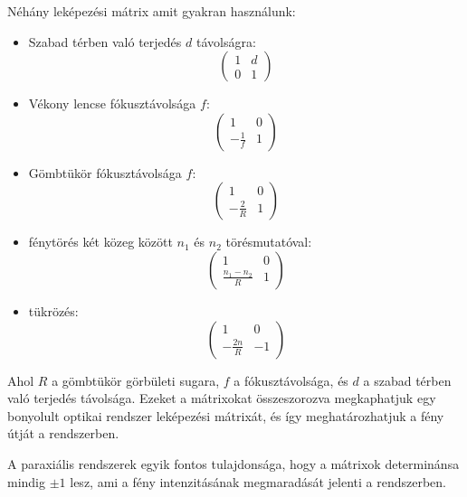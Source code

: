 \documentclass[a4paper,12pt]{article}
\begin{document}
Néhány leképezési mátrix amit gyakran használunk:
\begin{itemize}
    \item Szabad térben való terjedés $d$ távolságra:
    \begin{equation}
        \begin{pmatrix}
            1 & d \\
            0 & 1
        \end{pmatrix}
    \end{equation}
    \item Vékony lencse fókusztávolsága $f$:
    \begin{equation}
        \begin{pmatrix}
            1 & 0 \\
            -\frac{1}{f} & 1
        \end{pmatrix}
    \end{equation}
    \item Gömbtükör fókusztávolsága $f$:
    \begin{equation}
        \begin{pmatrix}
            1 & 0 \\
            -\frac{2}{R} & 1
        \end{pmatrix}
    \end{equation}
    \item fénytörés két közeg között $n_1$ és $n_2$ törésmutatóval:
    \begin{equation}
        \begin{pmatrix}
            1 & 0 \\
            \frac{n_1 - n_2}{R} & 1
        \end{pmatrix}
    \end{equation}
    \item tükrözés:
    \begin{equation}
        \begin{pmatrix}
            1 & 0 \\
            -\frac{2n}{R} & -1
        \end{pmatrix}
    \end{equation}
\end{itemize}
Ahol $R$ a gömbtükör görbületi sugara, $f$ a fókusztávolsága, és $d$ a szabad térben való terjedés távolsága. Ezeket a mátrixokat összeszorozva megkaphatjuk egy bonyolult optikai rendszer
leképezési mátrixát, és így meghatározhatjuk a fény útját a rendszerben.

A paraxiális rendszerek egyik fontos tulajdonsága, hogy a mátrixok determinánsa mindig $\pm 1$ lesz, ami a fény intenzitásának megmaradását jelenti a rendszerben.
\end{document}
